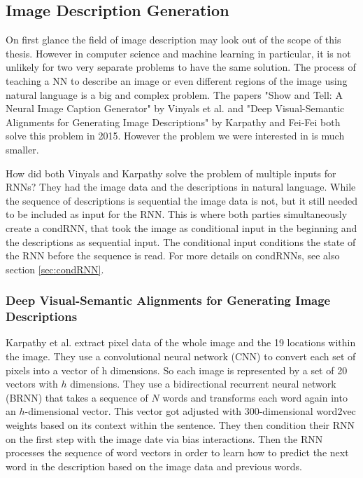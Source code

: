 \documentclass[
	ngerman,
	ruledheaders=section,%
	class=report,%
	thesis={type=bachelor},%
	accentcolor=9c,%
	custommargins=true,%
	marginpar=false,%
	parskip=half-,%
	fontsize=11pt,%
	twoside
]{tudapub}
\begin{document}


\subsection{Image Description Generation}
\label{sec:imagedesc}

On first glance the field of image description may look out of the scope of this thesis.
However in computer science and machine learning in particular, it is not unlikely for two very separate problems to have the same solution.
The process of teaching a NN to describe an image or even different regions of the image using natural language is a big and complex problem.
The papers "Show and Tell: A Neural Image Caption Generator" by Vinyals et al. \cite{vinyalsShowTellNeural2015} and "Deep Visual-Semantic Alignments for Generating Image Descriptions" by Karpathy and Fei-Fei \cite{karpathyDeepVisualSemanticAlignments2015} both solve this problem in 2015.
However the problem we were interested in is much smaller.

How did both Vinyals and Karpathy solve the problem of multiple inputs for RNNs?
They had the image data and the descriptions in natural language.
While the sequence of descriptions is sequential the image data is not, but it still needed to be included as input for the RNN.
This is where both parties simultaneously create a condRNN, that took the image as conditional input in the beginning and the descriptions as sequential input.
The conditional input conditions the state of the RNN before the sequence is read.
For more details on condRNNs, see also section \ref{sec:condRNN}.

\subsubsection{Deep Visual-Semantic Alignments for Generating Image Descriptions} %
\label{sec:karpathy}

Karpathy et al. extract pixel data of the whole image and the 19 locations within the image.
They use a convolutional neural network (CNN) to convert each set of pixels into a vector of h dimensions.
So each image is represented by a set of 20 vectors with $h$ dimensions.
They use a bidirectional recurrent neural network (BRNN) that takes a sequence of $N$ words and transforms each word again into an $h$-dimensional vector.
This vector got adjusted with 300-dimensional word2vec weights based on its context within the sentence.
They then condition their RNN on the first step with the image date via bias interactions.
Then the RNN processes the sequence of word vectors in order to learn how to predict the next word in the description based on the image data and previous words.
\end{document}
